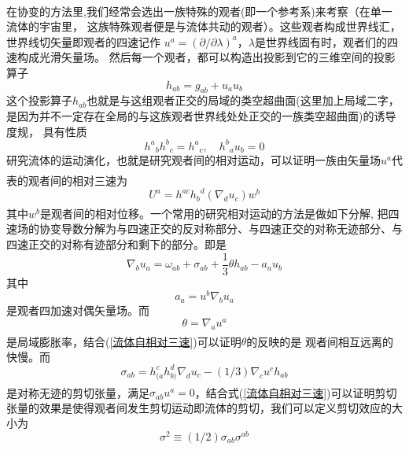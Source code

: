 \documentclass[fontset=windows,AutoFakeBold,a4paper]{article}
\newcommand{\upcite}[1]{\textsuperscript{\textsuperscript{\cite{#1}}}}  %
\begin{document}
\begin{spacing}{1.7}
    在协变的方法\upcite{4,5,6,7}里,我们经常会选出一族特殊的观者(即一个参考系)来考察（在单一流体的宇宙里，
    这族特殊观者便是与流体共动的观者）。这些观者构成世界线汇，世界线切矢量即观者的四速记作
    $u^{a}=(\partial/\partial\lambda)^{a}$，$\lambda$是世界线固有时，观者们的四速构成光滑矢量场。
    然后每一个观者，都可以构造出投影到它的三维空间的投影算子
    \begin{equation}
        h_{ab}=g_{ab}+u_{a}u_{b}
    \end{equation}
    这个投影算子$h_{ab}$也就是与这组观者正交的局域的类空超曲面(这里加上局域二字，
    是因为并不一定存在全局的与这族观者世界线处处正交的一族类空超曲面)的诱导度规，
    具有性质
    \begin{equation}
        {h^{a}}_{b}{h^{b}}_{c}={h^{a}}_{c},\quad {h^{b}}_{a}u_{b}=0
    \end{equation}
      研究流体的运动演化，也就是研究观者间的相对运动，可以证明一族由矢量场$u^{a}$代表的观者间的相对三速\upcite{3}为
    \begin{equation}
        \label{流体自相对三速}
        U^{a}=h^{ac}{h_{b}}^{d}(\nabla_{d}u_{c})w^{b}
    \end{equation}
    其中$w^{b}$是观者间的相对位移\upcite{3}。一个常用的研究相对运动的方法是做如下分解,
    把四速场的协变导数分解为与四速正交的反对称部分、与四速正交的对称无迹部分、与四速正交的对称有迹部分和剩下的部分。即是
    \begin{equation}
        \label{效果分解}
        \nabla_{b}u_{a}=\omega_{ab}+\sigma_{ab}+\frac{1}{3}\theta h_{ab}-a_{a}u_{b}
    \end{equation}
    其中
    \begin{equation}\label{a}
    a_{a}=u^{b}\nabla_{b}u_{a}
    \end{equation}
    是观者四加速对偶矢量场。而
    \begin{equation}\label{theta}
        \theta=\nabla_{a}u^{a}
    \end{equation}
    是局域膨胀率，结合(\ref{流体自相对三速})可以证明\upcite{3}$\theta$的反映的是
    观者间相互远离的快慢。而
    \begin{equation}\label{sigmaab}
        \sigma_{ab}=h^{c}_{(a}h_{b)}^{d}\nabla_{d}u_{c}-(1/3)\nabla_{c}u^{c}h_{ab}
    \end{equation}
    是对称无迹的剪切张量，满足$\sigma_{ab}u^{a}=0$，结合式(\ref{流体自相对三速})可以证明\upcite{3}剪切张量的效果是使得观者间发生剪切运动即流体的剪切，我们可以定义剪切效应的大小为
    \begin{equation}\label{sigma}
        \sigma^{2}\equiv (1/2)\sigma_{ab}\sigma^{ab}

\end{equation}
\end{spacing}
\end{document}
